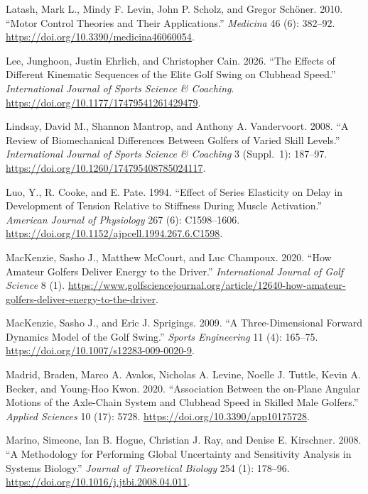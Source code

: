 \documentclass[
  letterpaper,
]{report}
\newlength{\cslhangindent}
\newenvironment{CSLReferences}[2] %
 {\begin{list}{}{%
  \setlength{\itemindent}{0pt}
  \setlength{\leftmargin}{0pt}
  \setlength{\parsep}{0pt}
  \ifodd #1
   \setlength{\leftmargin}{\cslhangindent}
   \setlength{\itemindent}{-1\cslhangindent}
  \fi
  \setlength{\itemsep}{#2\baselineskip}}}
 {\end{list}}
\begin{document}
\begin{CSLReferences}{1}{0}
Latash, Mark L., Mindy F. Levin, John P. Scholz, and Gregor Schöner.
2010. {``Motor Control Theories and Their Applications.''}
\emph{Medicina} 46 (6): 382--92.
\url{https://doi.org/10.3390/medicina46060054}.

Lee, Junghoon, Justin Ehrlich, and Christopher Cain. 2026. {``The
Effects of Different Kinematic Sequences of the Elite Golf Swing on
Clubhead Speed.''} \emph{International Journal of Sports Science \&
Coaching}. \url{https://doi.org/10.1177/17479541261429479}.

Lindsay, David M., Shannon Mantrop, and Anthony A. Vandervoort. 2008.
{``A Review of Biomechanical Differences Between Golfers of Varied Skill
Levels.''} \emph{International Journal of Sports Science \& Coaching} 3
(Suppl.~1): 187--97. \url{https://doi.org/10.1260/174795408785024117}.

Luo, Y., R. Cooke, and E. Pate. 1994. {``Effect of Series Elasticity on
Delay in Development of Tension Relative to Stiffness During Muscle
Activation.''} \emph{American Journal of Physiology} 267 (6):
C1598--1606. \url{https://doi.org/10.1152/ajpcell.1994.267.6.C1598}.

MacKenzie, Sasho J., Matthew McCourt, and Luc Champoux. 2020. {``How
Amateur Golfers Deliver Energy to the Driver.''} \emph{International
Journal of Golf Science} 8 (1).
\url{https://www.golfsciencejournal.org/article/12640-how-amateur-golfers-deliver-energy-to-the-driver}.

MacKenzie, Sasho J., and Eric J. Sprigings. 2009. {``A Three-Dimensional
Forward Dynamics Model of the Golf Swing.''} \emph{Sports Engineering}
11 (4): 165--75. \url{https://doi.org/10.1007/s12283-009-0020-9}.

Madrid, Braden, Marco A. Avalos, Nicholas A. Levine, Noelle J. Tuttle,
Kevin A. Becker, and Young-Hoo Kwon. 2020. {``Association Between the
on-Plane Angular Motions of the Axle-Chain System and Clubhead Speed in
Skilled Male Golfers.''} \emph{Applied Sciences} 10 (17): 5728.
\url{https://doi.org/10.3390/app10175728}.

Marino, Simeone, Ian B. Hogue, Christian J. Ray, and Denise E.
Kirschner. 2008. {``A Methodology for Performing Global Uncertainty and
Sensitivity Analysis in Systems Biology.''} \emph{Journal of Theoretical
Biology} 254 (1): 178--96.
\url{https://doi.org/10.1016/j.jtbi.2008.04.011}.


\end{CSLReferences}
\end{document}
